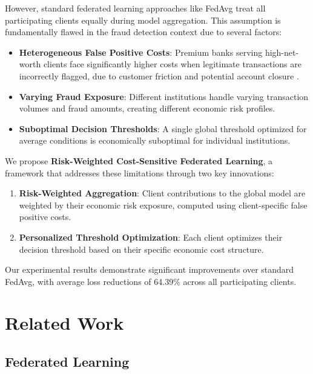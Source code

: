 \documentclass[conference]{IEEEtran}
\begin{document}
However, standard federated learning approaches like FedAvg \cite{mcmahan2017communication} treat all participating clients equally during model aggregation. This assumption is fundamentally flawed in the fraud detection context due to several factors:

\begin{itemize}
    \item \textbf{Heterogeneous False Positive Costs}: Premium banks serving high-net-worth clients face significantly higher costs when legitimate transactions are incorrectly flagged, due to customer friction and potential account closure \cite{elkan2001foundations}.
    \item \textbf{Varying Fraud Exposure}: Different institutions handle varying transaction volumes and fraud amounts, creating different economic risk profiles.
    \item \textbf{Suboptimal Decision Thresholds}: A single global threshold optimized for average conditions is economically suboptimal for individual institutions.
\end{itemize}

We propose \textbf{Risk-Weighted Cost-Sensitive Federated Learning}, a framework that addresses these limitations through two key innovations:

\begin{enumerate}
    \item \textbf{Risk-Weighted Aggregation}: Client contributions to the global model are weighted by their economic risk exposure, computed using client-specific false positive costs.
    \item \textbf{Personalized Threshold Optimization}: Each client optimizes their decision threshold based on their specific economic cost structure.
\end{enumerate}

Our experimental results demonstrate significant improvements over standard FedAvg, with average loss reductions of 64.39\% across all participating clients.

\section{Related Work}
\label{sec:related_work}

\subsection{Federated Learning}
\end{document}
